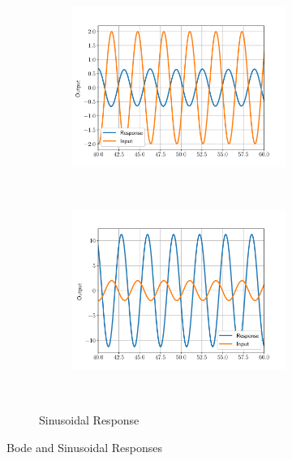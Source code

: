 \documentclass[titlepage, 11pt, reqno]{article}    %
\begin{document}
\begin{figure}[h]
\begin{subfigure}{0.38\textwidth}
        \begin{subfigure}[htbp]{\textwidth} 
            \includegraphics[width=\textwidth]{figures/G1_sinusoidal.pdf} 
        \end{subfigure} \\
        \begin{subfigure}[htbp]{\textwidth} 
            \includegraphics[width=\textwidth]{figures/G3_response.pdf} 
        \end{subfigure} 
        \caption{Sinusoidal Response}~\label{fig:sinusoidal_match}
    \end{subfigure}
    \caption{ Bode and Sinusoidal Responses}
\end{figure}
\clearpage
\end{document}
